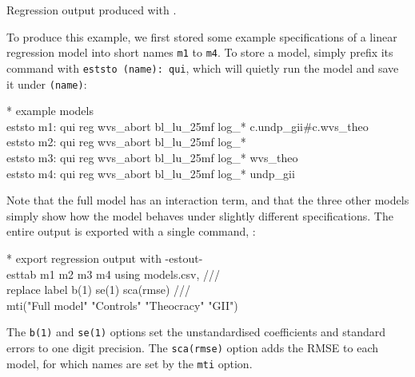 
\begin{fullwidth}
	\begin{table}
		\footnotesize
    
		\caption{Regression output produced with .}
		\label{tbl:estout_reg}
	\end{table}
\end{fullwidth}

To produce this example, we first stored some example specifications of a linear regression model into short names \texttt{m1} to \texttt{m4}. To store a model, simply prefix its command with \texttt{eststo (name): qui}, which will quietly run the model and save it under \texttt{(name)}:

\begin{docspec}
  * example models\\%
  eststo m1: qui reg wvs\_abort bl\_lu\_25mf log\_* c.undp\_gii\#c.wvs\_theo\\%
  eststo m2: qui reg wvs\_abort bl\_lu\_25mf log\_*\\%
  eststo m3: qui reg wvs\_abort bl\_lu\_25mf log\_* wvs\_theo\\%
  eststo m4: qui reg wvs\_abort bl\_lu\_25mf log\_* undp\_gii
\end{docspec}

Note that the full model has an interaction term, and that the three other models simply show how the model behaves under slightly different specifications. The entire output is exported with a single command, :

\begin{docspec}
  * export regression output with -estout-\\%
  esttab m1 m2 m3 m4 using models.csv, ///\\%
    replace label b(1) se(1) sca(rmse) ///\\%
  	mti("Full model" "Controls" "Theocracy" "GII")
\end{docspec}

The \texttt{b(1)} and \texttt{se(1)} options set the unstandardised coefficients and standard errors to one digit precision. The \texttt{sca(rmse)} option adds the RMSE to each model, for which names are set by the \texttt{mti} option.
